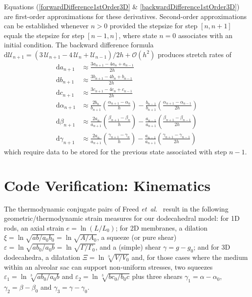 Equations (\ref{forwardDifference1stOrder3D} \& \ref{backwardDifference1stOrder3D}) are first-order approximations for these derivatives.  Second-order approximations can be established whenever $n > 0$ provided the stepsize for step $[n, n+1]$ equals the stepsize for step $[n-1, n]$, where state $n=0$ associates with an initial condition.  The backward difference formula  $\mathrm{d} \boldsymbol{\mathcal{U}}_{n+1} = ( 3 \, \boldsymbol{\mathcal{U}}_{n+1} -  4 \, \boldsymbol{\mathcal{U}}_{n} + \boldsymbol{\mathcal{U}}_{n-1} ) / 2h + \mathcal{O}(h^2)$ produces stretch rates of
\begin{equation}
\begin{aligned}
\mathrm{d} a_{n+1} & 
\approx \frac {3a_{n+1} - 4a_{n} +  a_{n-1}}{2h} \\ 
\mathrm{d} b_{n+1} & 
\approx \frac {3b_{n+1} - 4b_{n} +  b_{n-1}}{2h} \\
\mathrm{d} c_{n+1} & 
\approx \frac {3c_{n+1} - 4c_{n} +  c_{n-1}}{2h} \\
\mathrm{d} \alpha_{n+1} & 
\approx \frac{2b_{n}} {b_{n+1}} \left( \frac{\alpha_{n+1} - \alpha_{n}}{h} \right) - \frac{b_{n-1}} {b_{n+1}} \left( \frac{\alpha_{n+1} - \alpha_{n-1}}{2h} \right) \\
\mathrm{d} \beta_{n+1} & 
\approx \frac{2a_{n}}{a_{n+1}} \left( \frac{\beta_{n+1} - \beta_{n} }{h} \right) - \frac{a_{n-1}} {a_{n+1}} \left( \frac{\beta_{n+1} - \beta_{n-1}}{2h} \right) \\ 
\mathrm{d} \gamma_{n+1} & 
\approx \frac{2a_{n}} {a_{n+1}} \left(\frac{\gamma_{n+1} - \gamma_{n}}{h} \right) - \frac{a_{n-1}}{a_{n+1}} \left( \frac{\gamma_{n+1} - \gamma_{n-1}}{2h} \right) 
\end{aligned}
\label{backwardDifference2ndOrder3D}
\end{equation}
which require data to be stored for the previous state associated with step $n-1$.

\section{Code Verification: Kinematics}
\label{sec:verification}

The thermodynamic conjugate pairs of Freed \textit{et~al}.\ \cite{Freed17,Freedetal17,FreedZamani19} result in the following geometric/thermo\-dynamic strain measures for our dodecahedral model: for 1D rods, an axial strain $e = \ln ( L / L_0 )$; for 2D membranes, a dilation $\xi = \ln \sqrt{ab/a_0b_0} = \ln \sqrt{A/A_0}$, a squeeze (or pure shear) $\varepsilon = \ln \sqrt{ab_0/a_0b} = \ln \sqrt{\Gamma / \Gamma_0}$, and a (simple) shear $\gamma = g - g_0$; and for 3D dodecahedra, a dilatation $\Xi = \ln \sqrt[3]{V \! / V_0}$ and, for those cases where the medium within an alveolar sac can support non-uniform stresses, two squeezes $\varepsilon_1 = \ln \sqrt[3]{a b_0 / a_0 b}$ and $\varepsilon_2 = \ln \sqrt[3]{b c_0 / b_0 c}$ plus three shears $\gamma_1 = \alpha - \alpha_0$, $\gamma_2 = \beta - \beta_0$ and $\gamma_3 = \gamma - \gamma_0$. 

